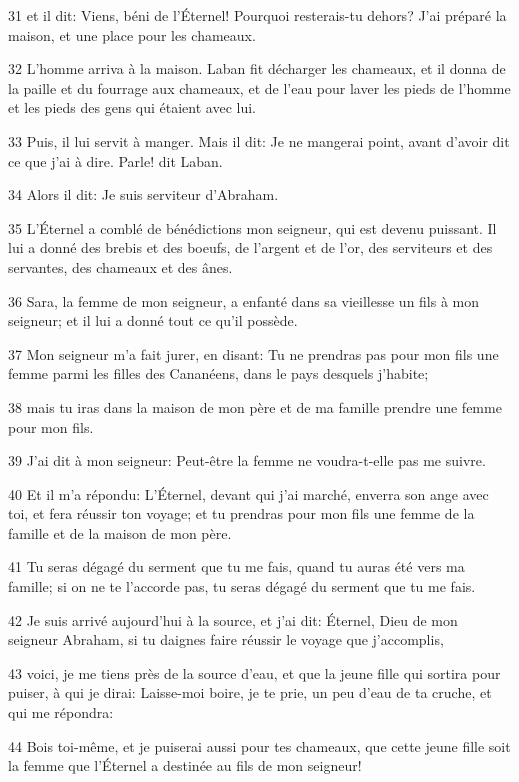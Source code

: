 \par 31 et il dit: Viens, béni de l'Éternel! Pourquoi resterais-tu dehors? J'ai préparé la maison, et une place pour les chameaux.
\par 32 L'homme arriva à la maison. Laban fit décharger les chameaux, et il donna de la paille et du fourrage aux chameaux, et de l'eau pour laver les pieds de l'homme et les pieds des gens qui étaient avec lui.
\par 33 Puis, il lui servit à manger. Mais il dit: Je ne mangerai point, avant d'avoir dit ce que j'ai à dire. Parle! dit Laban.
\par 34 Alors il dit: Je suis serviteur d'Abraham.
\par 35 L'Éternel a comblé de bénédictions mon seigneur, qui est devenu puissant. Il lui a donné des brebis et des boeufs, de l'argent et de l'or, des serviteurs et des servantes, des chameaux et des ânes.
\par 36 Sara, la femme de mon seigneur, a enfanté dans sa vieillesse un fils à mon seigneur; et il lui a donné tout ce qu'il possède.
\par 37 Mon seigneur m'a fait jurer, en disant: Tu ne prendras pas pour mon fils une femme parmi les filles des Cananéens, dans le pays desquels j'habite;
\par 38 mais tu iras dans la maison de mon père et de ma famille prendre une femme pour mon fils.
\par 39 J'ai dit à mon seigneur: Peut-être la femme ne voudra-t-elle pas me suivre.
\par 40 Et il m'a répondu: L'Éternel, devant qui j'ai marché, enverra son ange avec toi, et fera réussir ton voyage; et tu prendras pour mon fils une femme de la famille et de la maison de mon père.
\par 41 Tu seras dégagé du serment que tu me fais, quand tu auras été vers ma famille; si on ne te l'accorde pas, tu seras dégagé du serment que tu me fais.
\par 42 Je suis arrivé aujourd'hui à la source, et j'ai dit: Éternel, Dieu de mon seigneur Abraham, si tu daignes faire réussir le voyage que j'accomplis,
\par 43 voici, je me tiens près de la source d'eau, et que la jeune fille qui sortira pour puiser, à qui je dirai: Laisse-moi boire, je te prie, un peu d'eau de ta cruche, et qui me répondra:
\par 44 Bois toi-même, et je puiserai aussi pour tes chameaux, que cette jeune fille soit la femme que l'Éternel a destinée au fils de mon seigneur!
